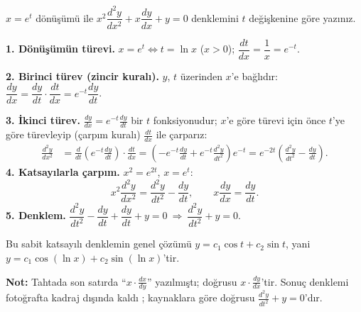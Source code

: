 \begin{soru}
$x=e^t$ dönüşümü ile $x^2\dfrac{d^2y}{dx^2}+x\dfrac{dy}{dx}+y=0$ denklemini $t$ değişkenine göre yazınız.
\end{soru}
\begin{cevap}
\textbf{1. Dönüşümün türevi.} $x=e^t\iff t=\ln x$ ($x>0$); $\dfrac{dt}{dx}=\dfrac1x=e^{-t}$.

\textbf{2. Birinci türev (zincir kuralı).} $y$, $t$ üzerinden $x$'e bağlıdır:
$\dfrac{dy}{dx}=\dfrac{dy}{dt}\cdot\dfrac{dt}{dx}=e^{-t}\dfrac{dy}{dt}$.

\textbf{3. İkinci türev.} $\frac{dy}{dx}=e^{-t}\frac{dy}{dt}$ bir $t$ fonksiyonudur; $x$'e göre türevi için önce $t$'ye göre
türevleyip (çarpım kuralı) $\frac{dt}{dx}$ ile çarparız:
\begin{align*}
\frac{d^2y}{dx^2}&=\frac{d}{dt}\left(e^{-t}\frac{dy}{dt}\right)\cdot\frac{dt}{dx}
=\left(-e^{-t}\frac{dy}{dt}+e^{-t}\frac{d^2y}{dt^2}\right)e^{-t}
=e^{-2t}\left(\frac{d^2y}{dt^2}-\frac{dy}{dt}\right).
\end{align*}
\textbf{4. Katsayılarla çarpım.} $x^2=e^{2t}$, $x=e^t$:
\[
x^2\frac{d^2y}{dx^2}=\frac{d^2y}{dt^2}-\frac{dy}{dt},\qquad x\frac{dy}{dx}=\frac{dy}{dt}.
\]
\textbf{5. Denklem.}
$\dfrac{d^2y}{dt^2}-\dfrac{dy}{dt}+\dfrac{dy}{dt}+y=0\ \Longrightarrow\ \boxed{\dfrac{d^2y}{dt^2}+y=0}$.

Bu sabit katsayılı denklemin genel çözümü $y=c_1\cos t+c_2\sin t$, yani $y=c_1\cos(\ln x)+c_2\sin(\ln x)$'tir.

\textbf{Not:} Tahtada son satırda ``$x\cdot\frac{dx}{dy}$'' yazılmıştı; doğrusu $x\cdot\frac{dy}{dx}$'tir. Sonuç denklemi
fotoğrafta kadraj dışında kaldı ; kaynaklara göre doğrusu $\frac{d^2y}{dt^2}+y=0$'dır.
\end{cevap}

